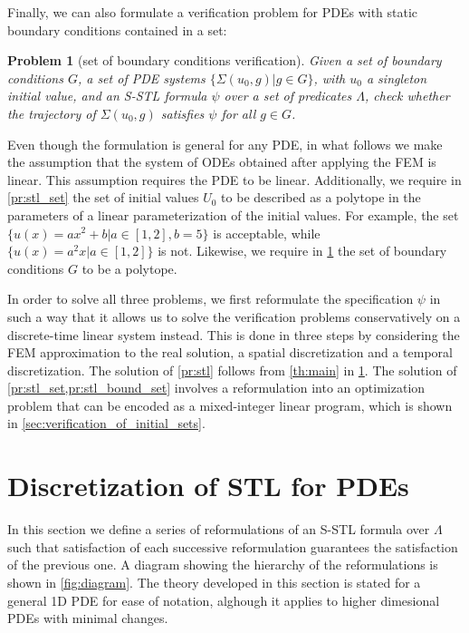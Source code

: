 \documentclass[letterpaper, 10 pt, conference]{ieeeconf/ieeeconf}
\newtheorem{problem}{Problem}
\begin{document}
Finally, we can also formulate a verification problem for PDEs with static
boundary conditions contained in a set:

\begin{problem}[set of boundary conditions verification]
\label{pr:stl_bound_set}
    Given a set of boundary conditions $G$, a set of PDE systems
    $\{\Sigma(u_0, g) | g \in G\}$, with $u_0$
    a singleton initial value, and an S-STL formula $\psi$ over a set of
    predicates $\Lambda$, check whether the trajectory of $\Sigma(u_0, g)$
    satisfies $\psi$ for all $g \in G$.
\end{problem}

Even though the formulation is general for any PDE, in what follows we make the
assumption that the system of ODEs obtained after applying the FEM is linear.
This assumption requires the PDE
to be linear. Additionally, we require in \cref{pr:stl_set} the set of initial
values $U_0$ to be described as a polytope in the parameters of a
linear parameterization of the initial values. For example, the set $\{u(x)
= a x^2 + b | a \in [1,2], b = 5\}$ is acceptable, while $\{u(x) = a^2 x |
a \in [1,2]\}$ is not. Likewise, we require in \cref{pr:stl_bound_set} the set
of boundary conditions $G$ to be a polytope.

In order to solve all three problems, we first reformulate the specification $\psi$
in such a way that it allows us to solve the verification problems
conservatively on a discrete-time linear system instead. This is done in three
steps by considering the FEM approximation to the real solution, a spatial
discretization and a temporal discretization. The solution of \cref{pr:stl}
follows from \cref{th:main} in
\cref{sec:formally_correct_discretization_of_pdestl}. The solution of
\cref{pr:stl_set,pr:stl_bound_set}
involves a reformulation into an optimization problem that can be encoded as a
mixed-integer linear program, which is shown in
\cref{sec:verification_of_initial_sets}.

\section{Discretization of STL for PDEs}
\label{sec:formally_correct_discretization_of_pdestl}

In this section we define a series of reformulations of an S-STL formula over
$\Lambda$ such that satisfaction of each successive reformulation guarantees the
satisfaction of the previous one. A diagram showing the hierarchy of the
reformulations is shown in \cref{fig:diagram}. The theory developed in this section is stated
for a general 1D PDE for ease of notation, alghough it applies to higher dimesional PDEs
with minimal changes.
\end{document}
